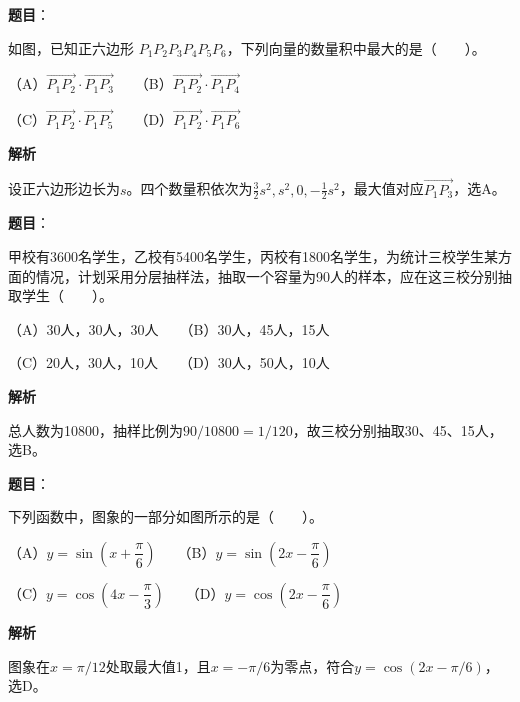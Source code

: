 \begin{answer}

\textbf{题目}：

如图，已知正六边形 $P_1P_2P_3P_4P_5P_6$，下列向量的数量积中最大的是\mbox{（　　）}。
\nopagebreak[4]
\begin{center}\end{center}
\nopagebreak[4]
（A）$\overrightarrow{P_1P_2}\cdot\overrightarrow{P_1P_3}$　　（B）$\overrightarrow{P_1P_2}\cdot\overrightarrow{P_1P_4}$

（C）$\overrightarrow{P_1P_2}\cdot\overrightarrow{P_1P_5}$　　（D）$\overrightarrow{P_1P_2}\cdot\overrightarrow{P_1P_6}$

\textbf{解析}

设正六边形边长为$s$。四个数量积依次为$\frac32s^2,s^2,0,-\frac12s^2$，最大值对应$\overrightarrow{P_1P_3}$，选A。


\end{answer}
\begin{answer}

\textbf{题目}：

甲校有3600名学生，乙校有5400名学生，丙校有1800名学生，为统计三校学生某方面的情况，计划采用分层抽样法，抽取一个容量为90人的样本，应在这三校分别抽取学生\mbox{（　　）}。

（A）30人，30人，30人　　（B）30人，45人，15人

（C）20人，30人，10人　　（D）30人，50人，10人

\textbf{解析}

总人数为10800，抽样比例为$90/10800=1/120$，故三校分别抽取30、45、15人，选B。


\end{answer}
\begin{answer}

\textbf{题目}：

下列函数中，图象的一部分如图所示的是\mbox{（　　）}。
\nopagebreak[4]
\begin{center}\end{center}
\nopagebreak[4]
（A）$y=\sin\left(x+\dfrac\pi6\right)$　　（B）$y=\sin\left(2x-\dfrac\pi6\right)$

（C）$y=\cos\left(4x-\dfrac\pi3\right)$　　（D）$y=\cos\left(2x-\dfrac\pi6\right)$

\textbf{解析}

图象在$x=\pi/12$处取最大值1，且$x=-\pi/6$为零点，符合$y=\cos(2x-\pi/6)$，选D。


\end{answer}

